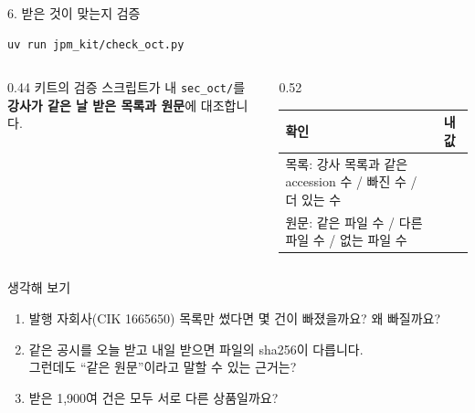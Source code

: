 \begin{frame}[fragile]{6. 받은 것이 맞는지 검증}
\begin{Verbatim}
uv run jpm_kit/check_oct.py
\end{Verbatim}
\small
\begin{columns}[T]
\begin{column}{0.44\textwidth}
\noindent 키트의 검증 스크립트가 내 \texttt{sec\_oct/}를 \textbf{강사가 같은 날 받은 목록과 원문}에 대조합니다.\\[4pt]
\end{column}
\begin{column}{0.52\textwidth}
\begin{tabularx}{\textwidth}{@{}X p{2.2cm}@{}}
\toprule
\textbf{확인} & \textbf{내 값} \\
\midrule
목록: 강사 목록과 같은 accession 수 / 빠진 수 / 더 있는 수 & \\[6pt]
원문: 같은 파일 수 / 다른 파일 수 / 없는 파일 수 & \\[6pt]
\bottomrule
\end{tabularx}
\end{column}
\end{columns}
\end{frame}

\begin{frame}{생각해 보기}
\begin{enumerate}\setlength\itemsep{10pt}
\item 발행 자회사(CIK 1665650) 목록만 썼다면 \alert{몇 건이 빠졌을까요?} 왜 빠질까요?
\item 같은 공시를 오늘 받고 내일 받으면 파일의 sha256이 다릅니다.\\
그런데도 \alert{``같은 원문''}이라고 말할 수 있는 근거는?
\item 받은 1,900여 건은 모두 \alert{서로 다른 상품}일까요? 
\end{enumerate}
\end{frame}
